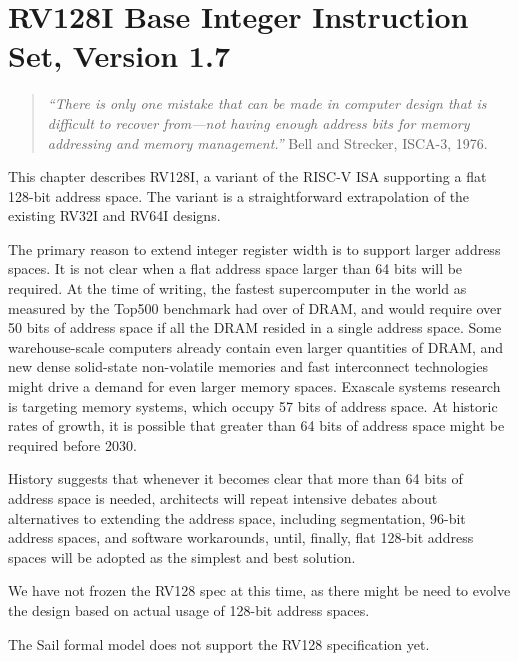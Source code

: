 \chapter{RV128I Base Integer Instruction Set, Version 1.7}
\label{rv128}

\begin{quote}
{\em ``There is only one mistake that can be made in computer design that is
difficult to recover from---not having enough address bits for memory
addressing and memory management.''} Bell and Strecker, ISCA-3, 1976.
\end{quote}

This chapter describes RV128I, a variant of the RISC-V ISA
supporting a flat 128-bit address space.  The variant is a
straightforward extrapolation of the existing RV32I and RV64I designs.

\begin{commentary}
The primary reason to extend integer register width is to support
larger address spaces.  It is not clear when a flat address space larger
than 64 bits will be required.  At the time of writing, the fastest
supercomputer in the world as measured by the Top500 benchmark had
over  of DRAM, and would require over 50 bits of address
space if all the DRAM resided in a single address space.  Some
warehouse-scale computers already contain even larger quantities of
DRAM, and new dense solid-state non-volatile memories and fast
interconnect technologies might drive a demand for even larger memory
spaces.  Exascale systems research is targeting 
memory systems, which occupy 57 bits of address space.  At historic
rates of growth, it is possible that greater than 64 bits of address
space might be required before 2030.

History suggests that whenever it becomes clear that more than 64 bits
of address space is needed, architects will repeat intensive debates
about alternatives to extending the address space, including
segmentation, 96-bit address spaces, and software workarounds, until,
finally, flat 128-bit address spaces will be adopted as the simplest
and best solution.

We have not frozen the RV128 spec at this time, as there might be need
to evolve the design based on actual usage of 128-bit address spaces.
\end{commentary}

\begin{formalcomment}
  The Sail formal model does not support the RV128 specification yet.
\end{formalcomment}

